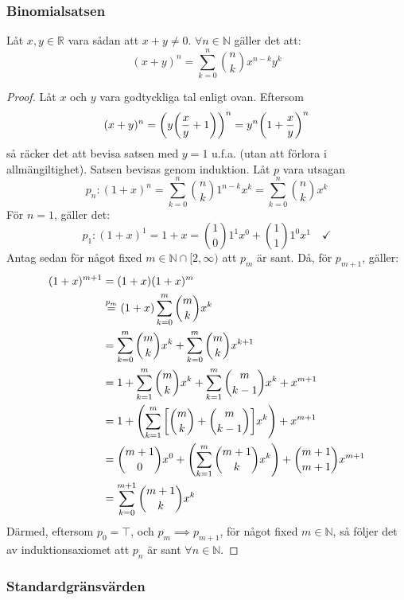 \subsubsection{Binomialsatsen}
\begin{theorem}[Binomialsatsen]
	Låt $x,y\in\mathbb{R}$ vara sådan att $x+y\neq0$. $\forall n\in\mathbb{N}$
	gäller det att:
	$$
		(x+y)^n=\sum_{k=0}^{n}{n\choose k}x^{n-k}y^k 
	$$

	\begin{proof}
		Låt $x$ och $y$ vara godtyckliga tal enligt ovan. Eftersom
		$$
			(x+y)^n=\qty(y\qty(\frac{x}{y}+1))^n=y^n\qty(1+\frac{x}{y})^n
		$$
		så räcker det att bevisa satsen med $y=1$ u.f.a. (utan att förlora i
		allmängiltighet). Satsen bevisas genom induktion. Låt $p$ vara utsagan
		$$
			p_n:(1+x)^n=\sum_{k=0}^{n}{n\choose k}1^{n-k}x^k=\sum_{k=0}^n{n\choose k}x^k
		$$
		För $n=1$, gäller det:
		$$
			p_1:(1+x)^1=1+x={1\choose 0}1^{1}x^0+{1\choose 1}1^0x^1\quad\checkmark
		$$
		Antag sedan för något fixed $m\in\mathbb{N}\cap[2,\infty)$ att $p_m$ är
		sant. Då, för $p_{m+1}$, gäller\footnotemark:
		\begin{align*}
			(1+x)^{m+1}&=(1+x)(1+x)^m\\
			&\stackrel{p_m}{=}(1+x)\sum_{k=0}^{m}{m\choose k}x^k\\
			&=\sum_{k=0}^{m}{m\choose k}x^k+\sum_{k=0}^{m}{m\choose k}x^{k+1}\\
			&=1+\sum_{k=1}^{m}{m\choose k}x^k+\sum_{k=1}^m{m\choose k-1}x^k+x^{m+1}\\
			&=1+\qty(\sum_{k=1}^{m}\qty[{m\choose k}+{m\choose k-1}]x^k)+x^{m+1}\\
			&={m+1\choose 0}x^0+\qty(\sum_{k=1}^{m}{m+1\choose k}x^k)+{m+1\choose m+1}x^{m+1}\\
			&=\sum_{k=0}^{m+1}{m+1\choose k}x^k
		\end{align*}
		Därmed, eftersom $p_0=\top$, och $p_m\implies p_{m+1}$, för något fixed
		$m\in\mathbb{N}$, så följer det av induktionsaxiomet att $p_n$ är sant
		$\forall n\in\mathbb{N}$.
	\end{proof}

\end{theorem}

\subsubsection{Standardgränsvärden}

